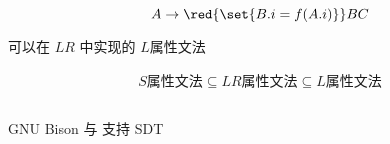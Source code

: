 \begin{frame}{}
  \begin{center}
    
  \end{center}
\end{frame}

\begin{frame}{}
  \begin{center}
    
  \end{center}
\end{frame}

\begin{frame}{}
  \begin{center}
    

    \pause
    \vspace{0.60cm}
    \[
      A \to \red{\set{B.i = f(A.i)}} B C
    \]
    \pause
  \end{center}
\end{frame}

\begin{frame}{}
  \begin{center}
    

    \vspace{0.50cm}
    \href{https://en.wikipedia.org/wiki/LR-attributed_grammar}{}

    \pause
    \vspace{0.20cm}
    可以在 $LR$ 中实现的 $L$属性文法

    \pause
    \vspace{0.20cm}
    \begin{align*}
      S\texttt{属性文法} \subseteq LR\texttt{属性文法} \subseteq L\texttt{属性文法}
    \end{align*}
  \end{center}
\end{frame}

\begin{frame}{}
  \begin{columns}
  \end{columns}

  \vspace{0.60cm}
  \begin{center}
    GNU Bison 与  支持 SDT
  \end{center}
\end{frame}

